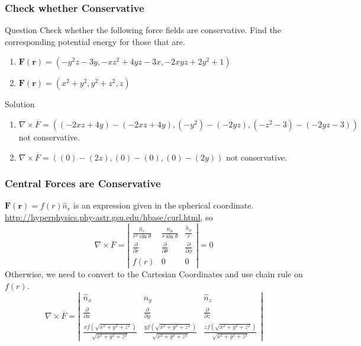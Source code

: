 \begin{frame}
\frametitle{Check whether Conservative}
\begin{block}{Question}
Check whether the following force fields are conservative. Find the corresponding potential energy for those that are.
\begin{enumerate}
\item{$\mathbf{F}(\mathbf{r})=(-y^2z-3y,-xz^2+4yz-3x,-2xyz+2y^2+1)$}
\item{$\mathbf{F}(\mathbf{r})=(x^2+y^2,y^2+z^2,z)$}
\end{enumerate}
\end{block}
\begin{block}{Solution}
\begin{enumerate}
\item{$\nabla\times\overline{F}=((-2xz+4y)-(-2xz+4y),(-y^2)-(-2yz),(-z^2-3)-(-2yz-3))$ not conservative.}
\item{$\nabla\times\overline{F}=((0)-(2z),(0)-(0),(0)-(2y))$ not conservative.}
\end{enumerate}
\end{block}
\end{frame}
\begin{frame}\label{centralforcesareconservative}
\frametitle{Central Forces are Conservative}
$\mathbf{F(\mathbf{r})}=f(r)\hat{n}_r$ is an expression given in the \alert{spherical} coordinate. \url{http://hyperphysics.phy-astr.gsu.edu/hbase/curl.html}, so
\[\nabla\times\overline{F}=\left|\begin{matrix}\frac{\hat{n}_r}{r^2\sin\theta}&\frac{\hat{n}_{\theta}}{r\sin\theta}&\frac{\hat{n}_{\phi}}{r}\\\frac{\partial}{\partial r}&\frac{\partial}{\partial \theta}&\frac{\partial}{\partial\phi}\\f(r)&0&0\end{matrix}\right|=0\]
Otherwise, we need to convert to the \alert{Cartesian Coordinates} and use \alert{chain rule} on $f(r)$.
\[\nabla\times\overline{F}=\left|\begin{matrix}\hat{n}_x&\hat{n}_y&\hat{n}_z\\\frac{\partial}{\partial x}&\frac{\partial}{\partial y}&\frac{\partial}{\partial z}\\\frac{xf(\sqrt{x^2+y^2+z^2})}{\sqrt{x^2+y^2+z^2}}&\frac{yf(\sqrt{x^2+y^2+z^2})}{\sqrt{x^2+y^2+z^2}}&\frac{zf(\sqrt{x^2+y^2+z^2})}{\sqrt{x^2+y^2+z^2}}\end{matrix}\right|\]
\end{frame}

